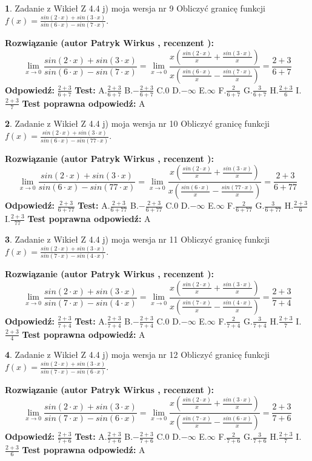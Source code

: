 \documentclass[12pt, a4paper]{article}
\theoremstyle{definition} %
\newtheorem{zad}{}
\newcommand{\zadStart}[1]{\begin{zad}#1\newline}
\newcommand{\zadStop}{\end{zad}}
\newcommand{\rozwStart}[2]{\noindent \textbf{Rozwiązanie (autor #1 , recenzent #2): }\newline}
\newcommand{\rozwStop}{\newline}
\newcommand{\odpStart}{\noindent \textbf{Odpowiedź:}\newline}
\newcommand{\odpStop}{\newline}
\newcommand{\testStart}{\noindent \textbf{Test:}\newline}
\newcommand{\testStop}{\newline}
\newcommand{\kluczStart}{\noindent \textbf{Test poprawna odpowiedź:}\newline}
\newcommand{\kluczStop}{\newline}
\begin{document}
\zadStart{Zadanie z Wikieł Z 4.4 j) moja wersja nr 9}
Obliczyć granicę funkcji $f(x)=\frac{sin(2\cdot x) +sin(3\cdot x)}{sin(6\cdot x) -sin(7\cdot x)}$.
\zadStop
\rozwStart{Patryk Wirkus}{}
$$\lim\limits_{x\to 0}\frac{sin(2\cdot x) +sin(3\cdot x)}{sin(6\cdot x) -sin(7\cdot x)}=\lim\limits_{x\to 0}\frac{x(\frac{sin(2\cdot x)}{x}+\frac{sin(3\cdot x)}{x})}{x(\frac{sin(6\cdot x)}{x}-\frac{sin(7\cdot x)}{x})}=\frac{2+3}{6+7}$$
\rozwStop
\odpStart
$\frac{2+3}{6+7}$
\odpStop
\testStart
A.$\frac{2+3}{6+7}$
B.$-\frac{2+3}{6+7}$
C.$0$
D.$-\infty$
E.$\infty$
F.$\frac{2}{6+7}$
G.$\frac{3}{6+7}$
H.$\frac{2+3}{6}$
I.$\frac{2+3}{7}$
\testStop
\kluczStart
A
\kluczStop



\zadStart{Zadanie z Wikieł Z 4.4 j) moja wersja nr 10}
Obliczyć granicę funkcji $f(x)=\frac{sin(2\cdot x) +sin(3\cdot x)}{sin(6\cdot x) -sin(77\cdot x)}$.
\zadStop
\rozwStart{Patryk Wirkus}{}
$$\lim\limits_{x\to 0}\frac{sin(2\cdot x) +sin(3\cdot x)}{sin(6\cdot x) -sin(77\cdot x)}=\lim\limits_{x\to 0}\frac{x(\frac{sin(2\cdot x)}{x}+\frac{sin(3\cdot x)}{x})}{x(\frac{sin(6\cdot x)}{x}-\frac{sin(77\cdot x)}{x})}=\frac{2+3}{6+77}$$
\rozwStop
\odpStart
$\frac{2+3}{6+77}$
\odpStop
\testStart
A.$\frac{2+3}{6+77}$
B.$-\frac{2+3}{6+77}$
C.$0$
D.$-\infty$
E.$\infty$
F.$\frac{2}{6+77}$
G.$\frac{3}{6+77}$
H.$\frac{2+3}{6}$
I.$\frac{2+3}{77}$
\testStop
\kluczStart
A
\kluczStop



\zadStart{Zadanie z Wikieł Z 4.4 j) moja wersja nr 11}
Obliczyć granicę funkcji $f(x)=\frac{sin(2\cdot x) +sin(3\cdot x)}{sin(7\cdot x) -sin(4\cdot x)}$.
\zadStop
\rozwStart{Patryk Wirkus}{}
$$\lim\limits_{x\to 0}\frac{sin(2\cdot x) +sin(3\cdot x)}{sin(7\cdot x) -sin(4\cdot x)}=\lim\limits_{x\to 0}\frac{x(\frac{sin(2\cdot x)}{x}+\frac{sin(3\cdot x)}{x})}{x(\frac{sin(7\cdot x)}{x}-\frac{sin(4\cdot x)}{x})}=\frac{2+3}{7+4}$$
\rozwStop
\odpStart
$\frac{2+3}{7+4}$
\odpStop
\testStart
A.$\frac{2+3}{7+4}$
B.$-\frac{2+3}{7+4}$
C.$0$
D.$-\infty$
E.$\infty$
F.$\frac{2}{7+4}$
G.$\frac{3}{7+4}$
H.$\frac{2+3}{7}$
I.$\frac{2+3}{4}$
\testStop
\kluczStart
A
\kluczStop



\zadStart{Zadanie z Wikieł Z 4.4 j) moja wersja nr 12}
Obliczyć granicę funkcji $f(x)=\frac{sin(2\cdot x) +sin(3\cdot x)}{sin(7\cdot x) -sin(6\cdot x)}$.
\zadStop
\rozwStart{Patryk Wirkus}{}
$$\lim\limits_{x\to 0}\frac{sin(2\cdot x) +sin(3\cdot x)}{sin(7\cdot x) -sin(6\cdot x)}=\lim\limits_{x\to 0}\frac{x(\frac{sin(2\cdot x)}{x}+\frac{sin(3\cdot x)}{x})}{x(\frac{sin(7\cdot x)}{x}-\frac{sin(6\cdot x)}{x})}=\frac{2+3}{7+6}$$
\rozwStop
\odpStart
$\frac{2+3}{7+6}$
\odpStop
\testStart
A.$\frac{2+3}{7+6}$
B.$-\frac{2+3}{7+6}$
C.$0$
D.$-\infty$
E.$\infty$
F.$\frac{2}{7+6}$
G.$\frac{3}{7+6}$
H.$\frac{2+3}{7}$
I.$\frac{2+3}{6}$
\testStop
\kluczStart
A
\kluczStop
\end{document}
